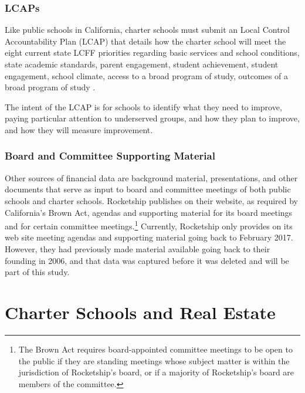 \subsubsection{LCAPs}\label{sec:cs-lcaps}\indent%

Like public schools in California, charter schools must submit an Local Control Accountability Plan (LCAP) that details how the charter school will meet the eight current state LCFF priorities regarding basic services and school conditions, state academic standards, parent engagement, student achievement, student engagement, school climate, access to a broad program of study, outcomes of a broad program of study \parencite[67–68]{Aguinaldo.etal2023}.

The intent of the LCAP is for schools to identify what they need to improve, paying particular attention to underserved groups, and how they plan to improve, and how they will measure improvement. 

\subsubsection{Board and Committee Supporting Material}\label{sec:board-committee-packets}\indent%

Other sources of financial data are background material, presentations, and other documents that serve as input to board and committee meetings of both public schools and charter schools.  Rocketship publishes on their website, as required by California's Brown Act, agendas and supporting material for its board meetings and for certain committee meetings.\footnote{The Brown Act requires board-appointed committee meetings to be open to the public if they are standing meetings whose subject matter is within the jurisdiction of Rocketship's board, or if a majority of Rocketship's board are members of the committee.} Currently, Rocketship only provides on its web site meeting agendas and supporting material going back to February 2017. However, they had previously made material available going back to their founding in 2006, and that data was captured before it was deleted and will be part of this study.

\section{Charter Schools and Real Estate}\label{sec:real-estate}\indent%

